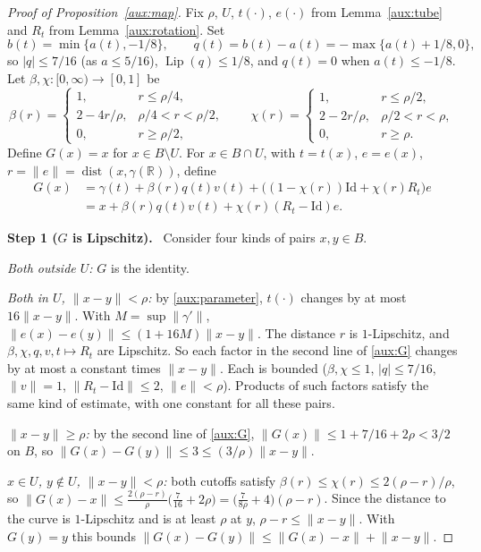 \documentclass[11pt]{article}
\newcommand{\R}{\mathbb R}
\newcommand{\norm}[1]{\lVert #1\rVert}
\DeclareMathOperator{\Lip}{Lip}
\DeclareMathOperator{\dist}{dist}
\newcommand{\step}[1]{\par\smallskip\noindent\textbf{Step #1.}\ }
\theoremstyle{definition}
\numberwithin{equation}{section}
\begin{document}
\begin{proof}[Proof of Proposition~\ref{aux:map}]
Fix $\rho$, $U$, $t(\cdot)$, $e(\cdot)$ from Lemma~\ref{aux:tube} and $R_t$
from Lemma~\ref{aux:rotation}. Set
\[
 b(t)=\min\{a(t),-1/8\},\qquad q(t)=b(t)-a(t)=-\max\{a(t)+1/8,0\},
\]
so $|q|\le7/16$ (as $a\le5/16$), $\Lip(q)\le1/8$, and $q(t)=0$ when
$a(t)\le-1/8$. Let $\beta,\chi:[0,\infty)\to[0,1]$ be
\[
 \beta(r)=
 \begin{cases}
 1,&r\le\rho/4,\\
 2-4r/\rho,&\rho/4<r<\rho/2,\\
 0,&r\ge\rho/2,
 \end{cases}
 \qquad
 \chi(r)=
 \begin{cases}
 1,&r\le\rho/2,\\
 2-2r/\rho,&\rho/2<r<\rho,\\
 0,&r\ge\rho.
 \end{cases}
\]
Define $G(x)=x$ for $x\in B\setminus U$. For $x\in B\cap U$, with $t=t(x)$,
$e=e(x)$, $r=\norm e=\dist(x,\gamma(\R))$, define
\begin{equation}\label{aux:G}
 \begin{split}
 G(x)&=\gamma(t)+\beta(r)q(t)v(t)
       +\bigl((1-\chi(r))\mathrm{Id}+\chi(r)R_t\bigr)e\\
 &=x+\beta(r)q(t)v(t)+\chi(r)(R_t-\mathrm{Id})e.
 \end{split}
\end{equation}

\step{1 ($G$ is Lipschitz)} Consider four kinds of pairs $x,y\in B$.

\emph{Both outside $U$:} $G$ is the identity.

\emph{Both in $U$, $\norm{x-y}<\rho$:} by \eqref{aux:parameter}, $t(\cdot)$
changes by at most $16\norm{x-y}$. With $M=\sup\norm{\gamma'}$,
$\norm{e(x)-e(y)}\le(1+16M)\norm{x-y}$. The distance $r$ is $1$-Lipschitz,
and $\beta,\chi,q,v,t\mapsto R_t$ are Lipschitz. So each factor in the
second line of \eqref{aux:G} changes by at most a constant times
$\norm{x-y}$. Each is bounded ($\beta,\chi\le1$, $|q|\le7/16$,
$\norm v=1$, $\norm{R_t-\mathrm{Id}}\le2$, $\norm e<\rho$). Products of
such factors satisfy the same kind of estimate, with one constant for all
these pairs.

\emph{$\norm{x-y}\ge\rho$:} by the second line of \eqref{aux:G},
$\norm{G(x)}\le1+7/16+2\rho<3/2$ on $B$, so
$\norm{G(x)-G(y)}\le3\le(3/\rho)\norm{x-y}$.

\emph{$x\in U$, $y\notin U$, $\norm{x-y}<\rho$:} both cutoffs satisfy
$\beta(r)\le\chi(r)\le2(\rho-r)/\rho$, so
$\norm{G(x)-x}\le\frac{2(\rho-r)}\rho\bigl(\frac7{16}+2\rho\bigr)
=\bigl(\frac7{8\rho}+4\bigr)(\rho-r)$. Since the distance to the curve is
$1$-Lipschitz and is at least $\rho$ at $y$, $\rho-r\le\norm{x-y}$. With
$G(y)=y$ this bounds
$\norm{G(x)-G(y)}\le\norm{G(x)-x}+\norm{x-y}$.


\end{proof}
\end{document}
